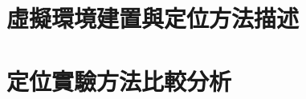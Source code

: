 \documentclass[12pt, a4paper]{ntust_report}
\begin{document}
\chapter{虛擬環境建置與定位方法描述}
\label{app}


\chapter{定位實驗方法比較分析}
\label{exp}


% 


\end{document}
